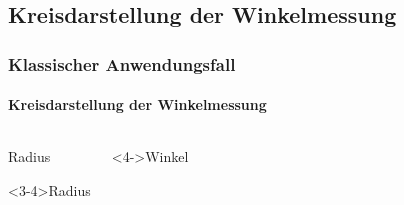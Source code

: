 \documentclass{beamer}
\begin{document}
\begin{frame}
\begin{columns}[c]
\begin{figure}
	\end{figure}
\end{columns}
\end{frame}
\subsection{Kreisdarstellung der Winkelmessung}
\begin{frame}
\frametitle{Klassischer Anwendungsfall}
\framesubtitle{Kreisdarstellung der Winkelmessung}
\begin{columns}[c]
	\begin{overprint}
		\begin{block}{Radius}
		\end{block}
		\begin{block}<3-4>{Radius}
		\end{block}
	\end{overprint}
	\begin{block}<4->{Winkel}
	\end{block}


\end{columns}
\end{frame}
\end{document}
